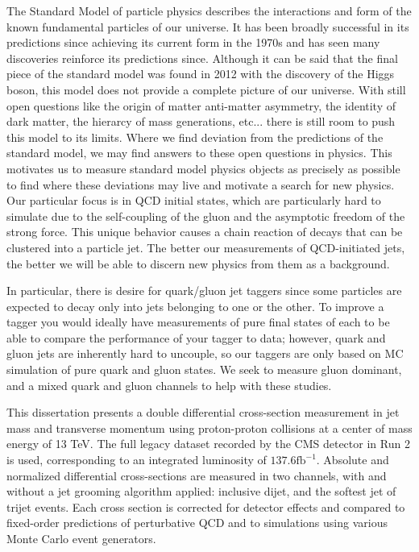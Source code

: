 
The Standard Model \cite{} of particle physics describes the interactions and form of the known fundamental particles of our universe. It has been broadly successful in its predictions since achieving its current form in the 1970s and has seen many discoveries reinforce its predictions since. Although it can be said that the final piece of the standard model was found in 2012 with the discovery of the Higgs boson, this model does not provide a complete picture of our universe. With still open questions like the origin of matter anti-matter asymmetry, the identity of dark matter, the hierarcy of mass generations, etc... there is still room to push this model to its limits. Where we find deviation from the predictions of the standard model, we may find answers to these open questions in physics. This motivates us to measure standard model physics objects as precisely as possible to find where these deviations may live and motivate a search for new physics. Our particular focus is in QCD initial states, which are particularly hard to simulate due to the self-coupling of the gluon and the asymptotic freedom of the strong force. This unique behavior causes a chain reaction of decays that can be clustered into a particle jet. The better our measurements of QCD-initiated jets, the better we will be able to discern new physics from them as a background.

In particular, there is desire for quark/gluon jet taggers since some particles are expected to decay only into jets belonging to one or the other. To improve a tagger you would ideally have measurements of pure final states of each to be able to compare the performance of your tagger to data; however, quark and gluon jets are inherently hard to uncouple, so our taggers are only based on MC simulation of pure quark and gluon states. We seek to measure gluon dominant, and a mixed quark and gluon channels to help with these studies.

This dissertation presents a double differential cross-section measurement in jet mass and transverse momentum using proton-proton collisions at a center of mass energy of 13 TeV. The full legacy dataset recorded by the CMS detector in Run 2 is used, corresponding to an integrated luminosity of $137.6 \text{fb}^{-1}$. Absolute and normalized differential cross-sections are measured in two channels, with and without a jet grooming algorithm applied: inclusive dijet, and the softest jet of trijet events. Each cross section is corrected for detector effects and compared to fixed-order predictions of perturbative QCD and to simulations using various Monte Carlo event generators.
